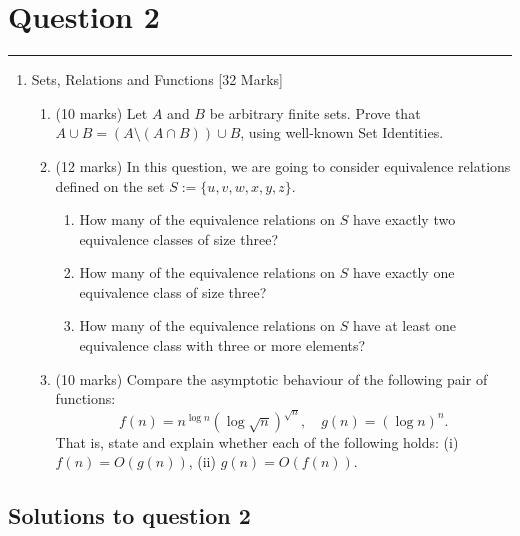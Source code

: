 \documentclass{article}
\begin{document}
\newpage
\section*{Question 2}
\hrule
\vspace{0.5cm}

\begin{enumerate}
    \item Sets, Relations and Functions [32 Marks]
          \begin{enumerate}[label=(\alph*)]
              \item (10 marks) Let $A$ and $B$ be arbitrary finite sets. Prove that $A \cup B = (A \setminus (A \cap B)) \cup B$, using well-known Set Identities.
              \item (12 marks) In this question, we are going to consider equivalence relations defined on the set $S := \{u, v, w, x, y, z\}$.
                    \begin{enumerate}[label=\roman*.]
                        \item How many of the equivalence relations on $S$ have exactly two equivalence classes of size three?
                        \item How many of the equivalence relations on $S$ have exactly one equivalence class of size three?
                        \item How many of the equivalence relations on $S$ have at least one equivalence class with three or more elements?
                    \end{enumerate}
              \item (10 marks) Compare the asymptotic behaviour of the following pair of functions:
                    \[
                        f(n) = n^{\log n} (\log \sqrt{n})^{\sqrt{n}},
                        \quad
                        g(n) = (\log n)^n.
                    \]
                    That is, state and explain whether each of the following holds: (i) $f(n) = O(g(n))$, (ii) $g(n) = O(f(n))$.
          \end{enumerate}
\end{enumerate}

\subsection*{Solutions to question 2}
\end{document}
